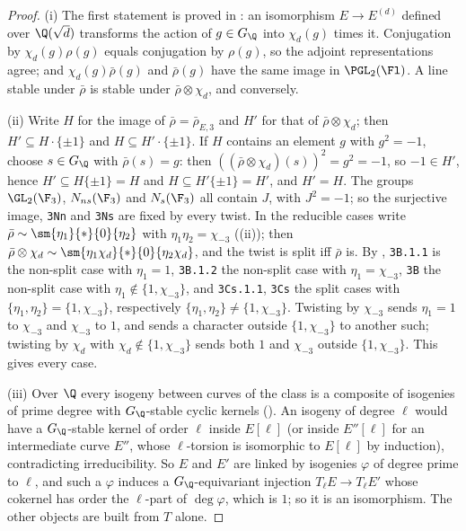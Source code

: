 \begin{proof}
(i) The first statement is proved in : an isomorphism $E\to E^{(d)}$ defined over $\Q(\sqrt d)$ transforms the action of
$g\in G_\Q$ into $\chi_d(g)$ times it. Conjugation by $\chi_d(g)\rho(g)$ equals conjugation by $\rho(g)$, so the adjoint representations agree; and
$\chi_d(g)\bar\rho(g)$ and $\bar\rho(g)$ have the same image in $\PGL_2(\Fl)$. A line stable under $\bar\rho$ is stable under $\bar\rho\otimes\chi_d$, and conversely.

(ii) Write $H$ for the image of $\bar\rho=\bar\rho_{E,3}$ and $H'$ for that of $\bar\rho\otimes\chi_d$; then $H'\subseteq H\cdot\{\pm1\}$ and $H\subseteq H'\cdot\{\pm1\}$.
If $H$ contains an element $g$ with $g^2=-1$, choose $s\in G_\Q$ with $\bar\rho(s)=g$: then $((\bar\rho\otimes\chi_d)(s))^2=g^2=-1$, so $-1\in H'$, hence
$H'\subseteq H\{\pm1\}=H$ and $H\subseteq H'\{\pm1\}=H'$, and $H'=H$. The groups $\GL_2(\F_3)$, $N_{ns}(\F_3)$ and $N_s(\F_3)$ all contain $J$, with $J^2=-1$; so
the surjective image, \texttt{3Nn} and \texttt{3Ns} are fixed by every twist. In the reducible cases write
$\bar\rho\sim\sm{\eta_1}{*}{0}{\eta_2}$ with $\eta_1\eta_2=\chi_{-3}$ ((ii)); then $\bar\rho\otimes\chi_d\sim\sm{\eta_1\chi_d}{*}{0}{\eta_2\chi_d}$,
and the twist is split iff $\bar\rho$ is. By , \texttt{3B.1.1} is the non-split case with $\eta_1=1$, \texttt{3B.1.2} the
non-split case with $\eta_1=\chi_{-3}$, \texttt{3B} the non-split case with $\eta_1\notin\{1,\chi_{-3}\}$, and \texttt{3Cs.1.1}, \texttt{3Cs} the split cases
with $\{\eta_1,\eta_2\}=\{1,\chi_{-3}\}$, respectively $\{\eta_1,\eta_2\}\ne\{1,\chi_{-3}\}$. Twisting by $\chi_{-3}$ sends $\eta_1=1$ to $\chi_{-3}$ and $\chi_{-3}$ to $1$,
and sends a character outside $\{1,\chi_{-3}\}$ to another such; twisting by $\chi_d$ with $\chi_d\notin\{1,\chi_{-3}\}$ sends both $1$ and $\chi_{-3}$ outside
$\{1,\chi_{-3}\}$. This gives every case.

(iii) Over $\Q$ every isogeny between curves of the class is a composite of isogenies of prime degree with $G_\Q$-stable cyclic kernels
(). An isogeny of degree $\ell$ would have a $G_\Q$-stable kernel of order $\ell$ inside $E[\ell]$ (or inside $E''[\ell]$ for an
intermediate curve $E''$, whose $\ell$-torsion is isomorphic to $E[\ell]$ by induction), contradicting irreducibility. So $E$ and $E'$ are linked
by isogenies $\varphi$ of degree prime to $\ell$, and such a $\varphi$ induces a $G_\Q$-equivariant injection $T_\ell E\to T_\ell E'$ whose cokernel has order the
$\ell$-part of $\deg\varphi$, which is $1$; so it is an isomorphism. The other objects are built from $T$ alone.
\end{proof}

